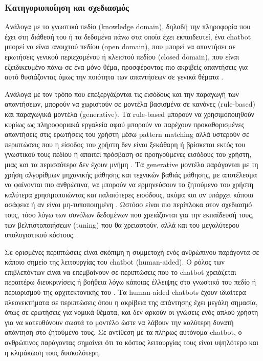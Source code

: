 \documentclass{article}
\begin{document}
\subsubsection{Κατηγοριοποίηση και σχεδιασμός}
\par Ανάλογα με το γνωστικό πεδίο (knowledge domain), δηλαδή την πληροφορία που έχει στη διάθεσή του ή τα δεδομένα πάνω στα οποία έχει εκπαιδευτεί, ένα chatbot μπορεί να είναι ανοιχτού πεδίου (open domain), που μπορεί να απαντήσει σε ερωτήσεις γενικού περιεχομένου ή κλειστού πεδίου (closed domain), που είναι εξειδικευμένο πάνω σε ένα μόνο θέμα, προσφέροντας πιο ακριβείς απαντήσεις για αυτό θυσιάζοντας όμως την ποιότητα των απαντήσεων σε γενικά θέματα \cite{adamopoulou-2020}.
\par Ανάλογα με τον τρόπο που επεξεργάζονται τις εισόδους και την παραγωγή των απαντήσεων, μπορούν να χωριστούν σε μοντέλα βασισμένα σε κανόνες (rule-based) και παραγωγικά μοντέλα (generative). Τα rule-based μπορούν να χρησιμοποιηθούν κυρίως ως πληροφοριακά εργαλεία αφού μπορούν να παρέχουν προκαθορισμένες απαντήσεις στις ερωτήσεις του χρήστη μέσω pattern matching αλλά υστερούν σε περιπτώσεις που η είσοδος του χρήστη δεν είναι ξεκάθαρη ή βρίσκεται εκτός του γνωστικού τους πεδίου ή απαιτεί πρόσβαση σε προηγούμενες εισόδους του χρήστη, μιας και τα περισσότερα δεν έχουν μνήμη \cite{adamopoulou-2020}. Τα generative μοντέλα παράγονται με τη χρήση αλγορίθμων μηχανικής μάθησης και τεχνικών βαθιάς μάθησης, με αποτέλεσμα να φαίνονται πιο ανθρώπινα, να μπορούν να ερμηνεύσουν το ζητούμενο του χρήστη καλύτερα χρησιμοποιώντας και παλαιότερες εισόδους, ακόμα και αν υπάρχει κάποια ασάφεια ή αν είναι μη-τυποποιημένη \cite{adamopoulou-2020}. Ωστόσο είναι πιο περίπλοκα στον σχεδιασμό τους, τόσο λόγω των συνόλων δεδομένων που χρειάζονται για την εκπαίδευσή τους, των βελτιστοποιήσεων (tuning) που θα χρειαστούν, αλλά και του μεγαλύτερου υπολογιστικού κόστους.
\par Σε ορισμένες περιπτώσεις είναι σκόπιμη η συμμετοχή ενός ανθρώπινου παράγοντα σε κάποιο σημείο της λειτουργίας του chatbot (human-aided). Ο ρόλος των επιβλεπόντων είναι να επεμβαίνουν σε περιπτώσεις που το chatbot χρειάζεται περαιτέρω διευκρινίσεις ή βοήθεια λόγω κάποιας έλλειψης στο γνωστικό του πεδίο ή περιορισμού της αρχιτεκτονικής του \cite{kucherbaev-2018}. Τα human-aided chatbots έχουν ιδιαίτερα πλεονεκτήματα σε περιπτώσεις όπου η ακρίβεια της απάντησης έχει μεγάλη σημασία, όπως σε ερωτήσεις για νομικά θέματα, και δεν αρκούν οι γνώσεις ενός απλού χρήστη για να κατευθύνουν σωστά το μοντέλο ώστε να λάβουν την καλύτερη δυνατή απάντηση στο ζητούμενο τους. Σε αντίθεση με τα πλήρως αυτόνομα chatbot, ο ανθρώπινος παράγοντας σημαίνει ότι το κόστος λειτουργίας τους είναι υψηλότερο και η κλιμάκωση τους δυσκολότερη.
\end{document}
